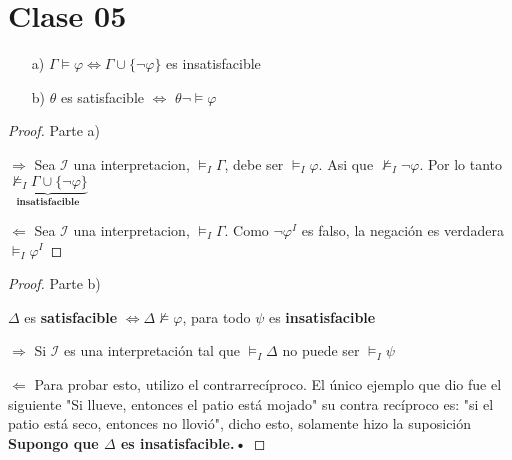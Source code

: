 \documentclass{amsart}
\begin{document}
\section*{Clase 05}

\begin{ejercicio}
\begin{enumerate}
	\item[a)] $\Gamma \models \varphi \iff \Gamma \cup \{ \neg \varphi \}$ es insatisfacible
	\item[b)] $\theta$ es satisfacible $\iff$ $\theta \neg \models \varphi$
\end{enumerate}

\begin{proof}
Parte a)

$\Rightarrow$ Sea $\mathcal{I}$ una interpretacion, $\models_{I} \Gamma$, debe ser $\models_{I} \varphi$. Asi que $\nvDash_{I} \neg \varphi$. Por lo tanto $\underbrace{\nvDash_{I} \Gamma \cup \{  \neg \varphi\}}_{\textbf{insatisfacible}}$

$\Leftarrow$ Sea $\mathcal{I}$ una interpretacion, $\models_{I} \Gamma$. Como $\neg \varphi^{I}$ es falso, la negaci\'on es verdadera $\models_{I} \varphi^{I}$
\end{proof}

\begin{proof}
Parte b)

$\Delta$ es \textbf{satisfacible} $\iff \Delta \nvDash \varphi$, para todo $\psi$ es \textbf{insatisfacible}

$\Rightarrow$ Si $\mathcal{I}$ es una interpretaci\'on tal que $\models_{I} \Delta$ no puede ser $\models_{I} \psi$

$\Leftarrow$ Para probar esto, utilizo el contrarrec\'iproco. El \'unico ejemplo que dio fue el siguiente "Si llueve, entonces el patio est\'a mojado" su contra rec\'iproco es: "si el patio est\'a seco, entonces no llovi\'o", dicho esto, solamente hizo la suposici\'on \textbf{Supongo que $\Delta$ es insatisfacible.\textbf{•}}

\end{proof}

\end{ejercicio}
\end{document}
